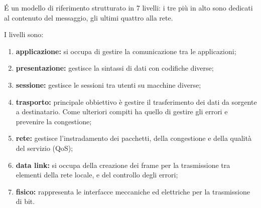 \documentclass{subfiles}
\begin{document}
\'E un modello di riferimento strutturato in 7 livelli: i tre più in alto sono dedicati al contenuto del messaggio, gli ultimi quattro alla rete.

I livelli sono:
\begin{enumerate}
    \item \textbf{applicazione:} si occupa di gestire la comunicazione tra le applicazioni;
    \item \textbf{presentazione:} gestisce la sintassi di dati con codifiche diverse;
    \item \textbf{sessione:} gestisce le sessioni tra utenti su macchine diverse;
    \item \textbf{trasporto:} principale obbiettivo è gestire il trasferimento dei dati da sorgente a destinatario.
          Come ulteriori compiti ha quello di gestire gli errori e prevenire la congestione;
    \item \textbf{rete:} gestisce l'instradamento dei pacchetti, della congestione e della qualità del servizio (QoS);
    \item \textbf{data link:} si occupa della creazione dei frame per la trasmissione tra elementi della rete locale, e del controllo degli errori;
    \item \textbf{fisico:} rappresenta le interfacce meccaniche ed elettriche per la trasmissione di bit.
\end{enumerate}
\end{document}
